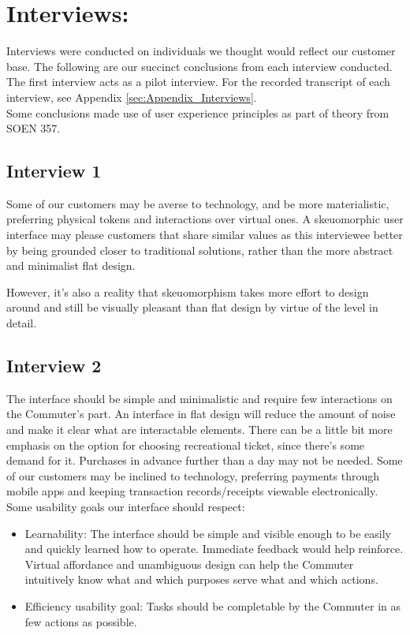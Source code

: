 \documentclass[letterpaper]{report}
\begin{document}
\section{Interviews:}
Interviews were conducted on individuals we thought would reflect our customer base. The following are our succinct conclusions from each interview conducted. The first interview acts as a pilot interview. For the recorded transcript of each interview, see Appendix \ref{sec:Appendix_Interviews}.\\
Some conclusions made use of user experience principles \cite{UIgoals} as part of theory from SOEN 357.
\subsection{Interview 1}
Some of our customers may be averse to technology, and be more materialistic, preferring physical tokens and interactions over virtual ones. A skeuomorphic user interface may please customers that share similar values as this interviewee better by being grounded closer to traditional solutions, rather than the more abstract and minimalist flat design. 

However, it's also a reality that skeuomorphism takes more effort to design around and still be visually pleasant than flat design by virtue of the level in detail. 

\subsection{Interview 2}
The interface should be simple and minimalistic and require few interactions on the Commuter's part. An interface in flat design will reduce the amount of noise and make it clear what are interactable elements. There can be a little bit more emphasis on the option for choosing recreational ticket, since there's some demand for it. Purchases in advance further than a day may not be needed. Some of our customers may be inclined to technology, preferring payments through mobile apps and keeping transaction records/receipts viewable electronically. 
Some usability goals our interface should respect:
\begin{itemize}
    \item Learnability: The interface should be simple and visible enough to be easily and quickly learned how to operate. Immediate feedback would help reinforce. Virtual affordance and unambiguous design can help the Commuter intuitively know what and which purposes serve what and which actions.
    \item Efficiency usability goal: Tasks should be completable by the Commuter in as few actions as possible.
\end{itemize}
\end{document}
